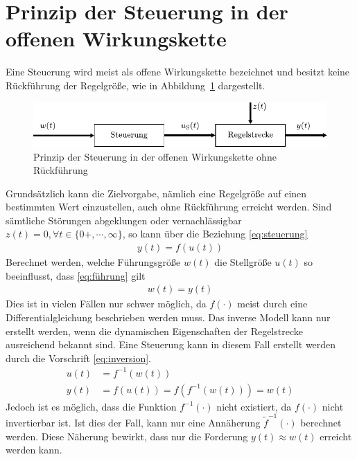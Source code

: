 \section{Prinzip der Steuerung in der offenen Wirkungskette}
%
Eine Steuerung wird meist als offene Wirkungskette bezeichnet und besitzt keine Rückführung der Regelgröße, wie in Abbildung~\ref{fig:steuerung} dargestellt.
%
\begin{figure}[h]
	\centering
	\includegraphics[width=0.95\linewidth]{Abbildungen/Grundbegriffe/PDF/Steuerung.pdf}
	\caption{Prinzip der Steuerung in der offenen Wirkungskette ohne Rückführung}
	\label{fig:steuerung}
\end{figure}
%
Grundsätzlich kann die Zielvorgabe, nämlich eine Regelgröße auf einen bestimmten Wert einzustellen, auch ohne Rückführung erreicht werden. Sind sämtliche Störungen abgeklungen oder vernachlässigbar $z(t)=0,\forall t \in\{0+,\cdots,\infty\}$, so kann über die Beziehung \eqref{eq:steuerung}
%
\begin{align}
y(t) = f(u(t))\label{eq:steuerung}
\end{align}
%
Berechnet werden, welche Führungsgröße $w(t)$ die Stellgröße $u(t)$ so beeinflusst, dass \eqref{eq:führung} gilt
%
\begin{align}
w(t) = y(t)\label{eq:führung}
\end{align}
%
Dies ist in vielen Fällen nur schwer möglich, da $f(\cdot)$ meist durch eine Differentialgleichung beschrieben werden muss. Das inverse Modell kann nur erstellt werden, wenn die dynamischen Eigenschaften der Regelstrecke ausreichend bekannt sind. Eine Steuerung kann in diesem Fall erstellt werden durch die Vorschrift \eqref{eq:inversion}. 
%
\begin{equation}
\begin{aligned}
u(t) &= f^{-1}(w(t))\\
y(t) &= f(u(t))=f\left(f^{-1}(w(t))\right)=w(t)\label{eq:inversion}
\end{aligned}
\end{equation}
%
Jedoch ist es möglich, dass die Funktion $f^{-1}(\cdot)$ nicht existiert, da $f(\cdot)$ nicht invertierbar ist. Ist dies der Fall, kann nur eine Annäherung $\tilde{f}^{-1}(\cdot)$ berechnet werden. Diese Näherung bewirkt, dass nur die Forderung $y(t)\approx w(t)$ erreicht werden kann.\\
